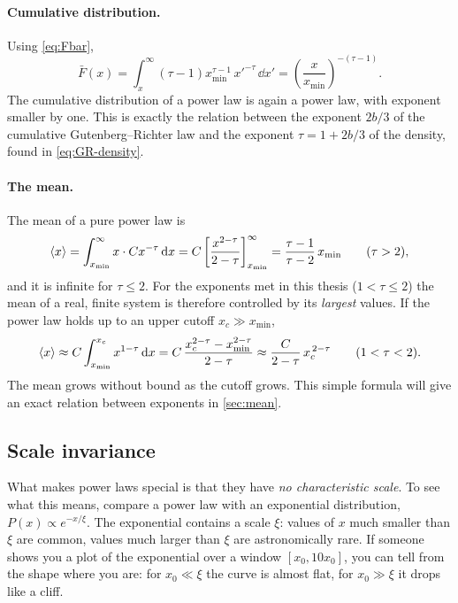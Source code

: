 \paragraph{Cumulative distribution.} Using \cref{eq:Fbar},
\begin{equation}
  \bar F(x) = \int_x^\infty (\tau-1)x_{\min}^{\tau-1}\, x'^{-\tau}\,\dd x'
  = \left(\frac{x}{x_{\min}}\right)^{-(\tau-1)} .
  \label{eq:Fbar-pl}
\end{equation}
The cumulative distribution of a power law is again a power law, with exponent smaller by one. This is
exactly the relation between the exponent $2b/3$ of the cumulative Gutenberg--Richter law and the
exponent $\tau = 1 + 2b/3$ of the density, found in \cref{eq:GR-density}.

\paragraph{The mean.} The mean of a pure power law is
\begin{equation}
  \left\langle x \right\rangle = \int_{x_{\min}}^{\infty} x\cdot C x^{-\tau}\,\mathrm{d} x = C\left[\frac{x^{2-\tau}}{2-\tau}\right]_{x_{\min}}^{\infty}
  = \frac{\tau-1}{\tau-2}\,x_{\min}\qquad(\tau>2),
\end{equation}
and it is infinite for $\tau\le 2$. For the exponents met in this thesis ($1<\tau\le2$) the mean of a real,
finite system is therefore controlled by its \emph{largest} values. If the power law holds up to an upper
cutoff $x_c\gg x_{\min}$,
\begin{equation}
  \left\langle x \right\rangle \approx C\int_{x_{\min}}^{x_c} x^{1-\tau}\,\mathrm{d} x = C\,\frac{x_c^{2-\tau} - x_{\min}^{2-\tau}}{2-\tau}
  \approx \frac{C}{2-\tau}\, x_c^{\,2-\tau}\qquad(1<\tau<2).
  \label{eq:mean-cutoff}
\end{equation}
The mean grows without bound as the cutoff grows. This simple formula will give an exact relation between
exponents in \cref{sec:mean}.

\subsection{Scale invariance}
\label{sec:scaleinv}

What makes power laws special is that they have \emph{no characteristic scale}. To see what this means,
compare a power law with an exponential distribution, $P(x)\propto e^{-x/\xi}$. The exponential contains a
scale $\xi$: values of $x$ much smaller than $\xi$ are common, values much larger than $\xi$ are
astronomically rare. If someone shows you a plot of the exponential over a window $[x_0, 10x_0]$, you can tell
from the shape where you are: for $x_0\ll\xi$ the curve is almost flat, for $x_0\gg\xi$ it drops like a cliff.


